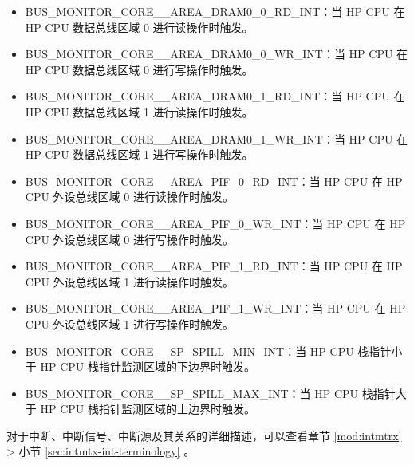 \documentclass[main\_\_CN.tex]{subfiles}
\begin{document}
\begin{itemize}
    \item \label{int:BUSMONITORCORE0AREADRAM00RDINT}BUS\_MONITOR\_CORE\_\_AREA\_DRAM0\_0\_RD\_INT：当 HP CPU 在 HP CPU 数据总线区域 0 进行读操作时触发。
    \item \label{int:BUSMONITORCORE0AREADRAM00WRINT}BUS\_MONITOR\_CORE\_\_AREA\_DRAM0\_0\_WR\_INT：当 HP CPU 在 HP CPU 数据总线区域 0 进行写操作时触发。
    \item \label{int:BUSMONITORCORE0AREADRAM01RDINT}BUS\_MONITOR\_CORE\_\_AREA\_DRAM0\_1\_RD\_INT：当 HP CPU 在 HP CPU 数据总线区域 1 进行读操作时触发。
    \item \label{int:BUSMONITORCORE0AREADRAM01WRINT}BUS\_MONITOR\_CORE\_\_AREA\_DRAM0\_1\_WR\_INT：当 HP CPU 在 HP CPU 数据总线区域 1 进行写操作时触发。
    \item \label{int:BUSMONITORCORE0AREAPIF0RDINT}BUS\_MONITOR\_CORE\_\_AREA\_PIF\_0\_RD\_INT：当 HP CPU 在 HP CPU 外设总线区域 0 进行读操作时触发。
    \item \label{int:BUSMONITORCORE0AREAPIF0WRINT}BUS\_MONITOR\_CORE\_\_AREA\_PIF\_0\_WR\_INT：当 HP CPU 在 HP CPU 外设总线区域 0 进行写操作时触发。
    \item \label{int:BUSMONITORCORE0AREAPIF1RDINT}BUS\_MONITOR\_CORE\_\_AREA\_PIF\_1\_RD\_INT：当 HP CPU 在 HP CPU 外设总线区域 1 进行读操作时触发。
    \item \label{int:BUSMONITORCORE0AREAPIF1WRINT}BUS\_MONITOR\_CORE\_\_AREA\_PIF\_1\_WR\_INT：当 HP CPU 在 HP CPU 外设总线区域 1 进行写操作时触发。
    \item \label{int:BUSMONITORCORE0SPSPILLMININT}BUS\_MONITOR\_CORE\_\_SP\_SPILL\_MIN\_INT：当 HP CPU 栈指针小于 HP CPU 栈指针监测区域的下边界时触发。
    \item \label{int:BUSMONITORCORE0SPSPILLMAXINT}BUS\_MONITOR\_CORE\_\_SP\_SPILL\_MAX\_INT：当 HP CPU 栈指针大于 HP CPU 栈指针监测区域的上边界时触发。
\end{itemize}

\begin{tiplisting}
对于中断、中断信号、中断源及其关系的详细描述，可以查看章节 \ref{mod:intmtrx} \textit{} > 小节 \ref{sec:intmtx-int-terminology} \textit{}。
\end{tiplisting}
\end{document}
